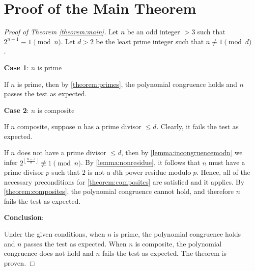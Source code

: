 \documentclass{article}
\theoremstyle{plain}
\theoremstyle{definition}
\newcommand{\floor}[1]{\left\lfloor #1 \right\rfloor}
\begin{document}
\section{Proof of the Main Theorem}
\begin{proof}[Proof of Theorem \ref{theorem:main}]
Let $n$ be an odd integer $>3$ such that $2^{n-1} \equiv 1 \pmod{n}$. Let $d > 2$ be the least prime integer such that $n \not\equiv 1 \pmod{d}$.

\textbf{Case 1}: $n$ is prime

If $n$ is prime, then by \cref{theorem:primes}, the polynomial congruence holds and $n$ passes the test as expected.

\textbf{Case 2}: $n$ is composite

If $n$ composite, suppose $n$ has a prime divisor $\leq d$. Clearly, it fails the test as expected.

If $n$ does not have a prime divisor $\leq d$, then by \cref{lemma:incongruencemodn} we infer $2^{\floor{\frac{n-1}{d}}} \not\equiv 1 \pmod{n}$. By \cref{lemma:nonresidue}, it follows that $n$ must have a prime divisor $p$ such that $2$ is not a $d$th power residue modulo $p$. Hence, all of the necessary preconditions for \cref{theorem:composites} are satisfied and it applies. By \cref{theorem:composites}, the polynomial congruence cannot hold, and therefore $n$ fails the test as expected.

\textbf{Conclusion}:

Under the given conditions, when $n$ is prime, the polynomial congruence holds and $n$ passes the test as expected. When $n$ is composite, the polynomial congruence does not hold and $n$ fails the test as expected. The theorem is proven.
\end{proof}
\end{document}
